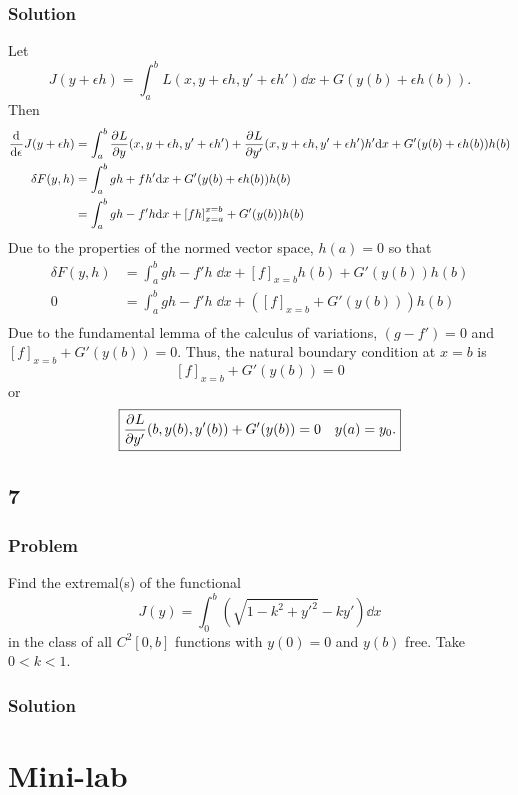 \documentclass[12pt,twoside]{article}
\begin{document}
\subsubsection*{Solution}
Let
\begin{equation*}
  J(y+\epsilon h) = \int_a^b L(x,y+\epsilon h, y'+\epsilon h')\dd{x} + G(y(b) + \epsilon h(b)).
\end{equation*}
Then
\begin{align*}
  \frac{\mathrm{d}^{} {}}{\mathrm{d}{\epsilon}^{}} J(y+\epsilon h) &= \int_a^b\frac{\partial^{} {L}}{\partial {y}^{}}(x,y+\epsilon h, y'+\epsilon h') +
                                    \frac{\partial^{} {L}}{\partial {y'}^{}}(x,y+\epsilon h, y'+\epsilon h')h'\mathrm{d}{x} +
                                    G'(y(b)+\epsilon h(b))h(b) \\
  \delta F(y,h) &= \int_a^b g h + f h'\mathrm{d}{x} + G'(y(b)+\epsilon h(b))h(b) \\
  &= \int_a^b gh - f'h\mathrm{d}{x} + {[fh]}_{x=a}^{x=b} + G'(y(b))h(b) \\
\end{align*}
Due to the properties of the normed vector space, $h(a)=0$ so that
\begin{align*}
  \delta F(y,h) &= \int_a^b gh - f'h\;\dd{x} + {[f]}_{x=b}h(b) + G'(y(b))h(b) \\
  0 &= \int_a^b gh - f'h\;\dd{x} + ({[f]}_{x=b} + G'(y(b)))h(b) \\
\end{align*}
Due to the fundamental lemma of the calculus of variations, $(g-f')=0$ and
${[f]}_{x=b} + G'(y(b))=0$. Thus, the natural boundary condition at $x=b$ is
\begin{equation*}
  {[f]}_{x=b} + G'(y(b))=0
\end{equation*}
or
\begin{equation*}
  \boxed{\frac{\partial^{} {L}}{\partial {y'}^{}}(b,y(b),y'(b)) + G'(y(b)) = 0 \quad y(a)=y_0.}
\end{equation*}

\subsection{7}
\subsubsection*{Problem}
Find the extremal{(s)} of the functional
\begin{equation}
  \label{eq:7-problem}
  J(y)=\int_0^b(\sqrt{1-k^2+y'^2}-ky') \dd{x}
\end{equation}
in the class of all $C^2[0,b]$ functions with $y(0)=0$ and $y(b)$ free. Take
$0<k<1$.

\subsubsection*{Solution}
\todo{}

\section{Mini-lab}
\end{document}
